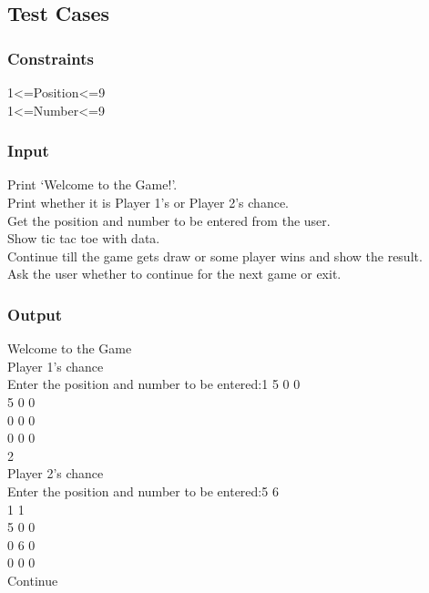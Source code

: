 \documentclass[12pt]{article}
\begin{document}
 \newpage
  \subsection{Test Cases}
  \subsubsection{Constraints}
  1<=Position<=9\\
1<=Number<=9\\


	\subsubsection{Input}
	Print ‘Welcome to the Game!’. \\   
Print whether it is Player 1’s or Player 2’s chance.\\
Get the position and number to be entered from the user.\\
Show tic tac toe with data.\\
Continue till the game gets draw or some player wins and show the result.\\
Ask the user whether to continue for the next game or exit.\\
\subsubsection{Output}
Welcome to the Game\\
Player 1's chance\\
Enter the position and number to be entered:1 5
0 0\\
5 0 0\\
0 0 0\\
0 0 0\\
2\\
Player 2’s chance\\
Enter the position and number to be entered:5 6\\
1 1\\
5 0 0\\
0 6 0\\
0 0 0\\
Continue
\end{document}
